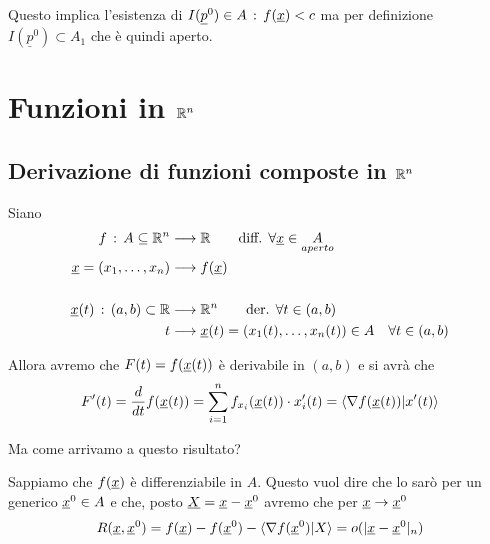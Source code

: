 Questo implica l'esistenza di $I(\underline{p}^0) \in A \, : \, f(\underline{x})<c$ ma per definizione $I(\underline{p}^0) \subset A_1$ che è quindi aperto.

\section{Funzioni in $\mathbb{R}^n$}

\subsection{Derivazione di funzioni composte in $\mathbb{R}^n$}

Siano
\begin{align}
	f \, : \, A \subseteq \mathbb{R}^n {}&\longrightarrow \mathbb{R} \qquad \text{diff. } \forall \underline{x}\in \underset{aperto}{A} \\
	\underline{x}= (x_1,\dots,x_n) &\longrightarrow f(\underline{x}) \nonumber \\
	\nonumber \\
	\underline{x}(t) \, : \, (a,b)\subset \mathbb{R} &\longrightarrow \mathbb{R}^n \qquad \text{der. } \forall t\in (a,b)\\
	t &\longrightarrow \underline{x}(t) = (x_1(t), \dots , x_n(t))\in A \quad \forall t \in (a,b) \nonumber
\end{align}

Allora avremo che $F(t)=f(\underline{x}(t))$ è derivabile in $(a,b)$ e si avrà che
\begin{align}
	F'(t)= \frac{d }{d t}f(\underline{x}(t)) = \sum_{i=1}^{n}f_{x_i}(\underline{x}(t)) \cdot x'_i(t) = \braket{\nabla f(\underline{x}(t))|x'(t)}
\end{align}

\bigskip
Ma come arrivamo a questo risultato?
\bigskip

Sappiamo che $f(\underline{x})$ è differenziabile in $A$. Questo vuol dire che lo sarò per un generico $\underline{x}^0\in A$ e che, posto $\underline{X}= \underline{x} - \underline{x}^0$ avremo che per $\underline{x} \rightarrow \underline{x}^0$
\begin{align}
	R(\underline{x},\underline{x}^0)=f(\underline{x}) - f(\underline{x}^0) - \braket{\nabla f(\underline{x}^0)|X} = o(| \underline{x} - \underline{x}^0 |_n) 
\end{align}

